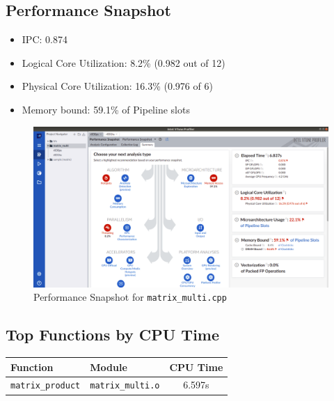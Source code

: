 \documentclass[11pt, swedish, openany]{book}
\begin{document}
\subsection*{Performance Snapshot}
\begin{itemize}
    \item IPC: 0.874
    \item Logical Core Utilization: 8.2\% (0.982 out of 12)
    \item Physical Core Utilization: 16.3\% (0.976 of 6)
    \item Memory bound: 59.1\% of Pipeline slots
\end{itemize}

\begin{figure}[H]
    \centering
    \includegraphics[scale=0.25]{vtune/matrix_multi/ps.png}
    \caption{Performance Snapshot for \texttt{matrix\_multi.cpp}}
\end{figure}

\newpage
\subsection*{Top Functions by CPU Time}
\begin{table}[H]
    \begin{tabular}{||l|l||c||}
        \hline
        Function                 & Module                   & CPU Time \\
        \hline
        \texttt{matrix\_product} & \texttt{matrix\_multi.o} & 6.597s   \\
        \hline
    \end{tabular}
\end{table}
\end{document}
